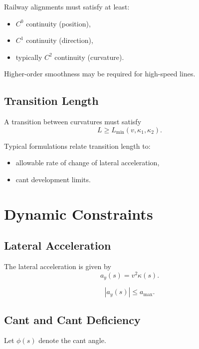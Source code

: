 Railway alignments must satisfy at least:
\begin{itemize}
\item $C^0$ continuity (position),
\item $C^1$ continuity (direction),
\item typically $C^2$ continuity (curvature).
\end{itemize}

Higher-order smoothness may be required for high-speed lines.


\subsection{Transition Length}

\begin{definition}
A transition between curvatures must satisfy
\[
L \geq L_{\min}(v,\kappa_1,\kappa_2).
\]
\end{definition}

Typical formulations relate transition length to:
\begin{itemize}
\item allowable rate of change of lateral acceleration,
\item cant development limits.
\end{itemize}


\section{Dynamic Constraints}

\subsection{Lateral Acceleration}

\begin{definition}
The lateral acceleration is given by
\[
a_y(s) = v^2 \kappa(s).
\]
\end{definition}

\begin{constraint}
\[
|a_y(s)| \leq a_{\max}.
\]
\end{constraint}


\subsection{Cant and Cant Deficiency}

\begin{definition}
Let $\phi(s)$ denote the cant angle.
\end{definition}

